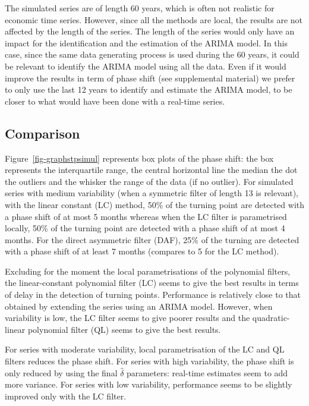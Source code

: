 \documentclass[
]{article}
\newcommand\1{\mathds{1}}
\begin{document}
The simulated series are of length 60 years, which is often not
realistic for economic time series. However, since all the methods are
local, the results are not affected by the length of the series. The
length of the series would only have an impact for the identification
and the estimation of the ARIMA model. In this case, since the same data
generating process is used during the 60 years, it could be relevant to
identify the ARIMA model using all the data. Even if it would improve
the results in term of phase shift (see supplemental material) we prefer
to only use the last 12 years to identify and estimate the ARIMA model,
to be closer to what would have been done with a real-time series.

\subsection{Comparison}\label{comparison}

Figure~\ref{fig-graphstpsimul} represents box plots of the phase shift:
the box represents the interquartile range, the central horizontal line
the median the dot the outliers and the whisker the range of the data
(if no outlier). For simulated series with medium variability (when a
symmetric filter of length 13 is relevant), with the linear constant
(LC) method, 50\% of the turning point are detected with a phase shift
of at most 5 months whereas when the LC filter is parametrised locally,
50\% of the turning point are detected with a phase shift of at most 4
months. For the direct asymmetric filter (DAF), 25\% of the turning are
detected with a phase shift of at least 7 months (compares to 5 for the
LC method).

Excluding for the moment the local parametrisations of the polynomial
filters, the linear-constant polynomial filter (LC) seems to give the
best results in terms of delay in the detection of turning points.
Performance is relatively close to that obtained by extending the series
using an ARIMA model. However, when variability is low, the LC filter
seems to give poorer results and the quadratic-linear polynomial filter
(QL) seems to give the best results.

For series with moderate variability, local parametrisation of the LC
and QL filters reduces the phase shift. For series with high
variability, the phase shift is only reduced by using the final
\(\hat\delta\) parameters: real-time estimates seem to add more
variance. For series with low variability, performance seems to be
slightly improved only with the LC filter.
\end{document}
